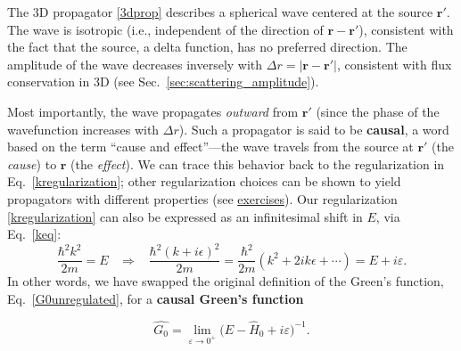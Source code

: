 \documentclass[prx,12pt]{revtex4-2}
\begin{document}
The 3D propagator \eqref{3dprop} describes a spherical wave centered
at the source $\mathbf{r}'$.  The wave is isotropic (i.e., independent
of the direction of $\mathbf{r} - \mathbf{r}'$), consistent with the
fact that the source, a delta function, has no preferred direction.
The amplitude of the wave decreases inversely with $\Delta r =
|\mathbf{r}-\mathbf{r}'|$, consistent with flux conservation in 3D
(see Sec.~\ref{sec:scattering_amplitude}).

Most importantly, the wave propagates \textit{outward} from
$\mathbf{r}'$ (since the phase of the wavefunction increases with
$\Delta r$).  Such a propagator is said to be \textbf{causal}, a word
based on the term ``cause and effect''---the wave travels from the
source at $\mathbf{r}'$ (the \textit{cause}) to $\mathbf{r}$ (the
\textit{effect}).  We can trace this behavior back to the
regularization in Eq.~\eqref{kregularization}; other regularization
choices can be shown to yield propagators with different properties
(see \hyperref[ex:anticausal]{exercises}).  Our regularization
\eqref{kregularization} can also be expressed as an infinitesimal
shift in $E$, via Eq.~\eqref{keq}:
\begin{equation}
  \frac{\hbar^2 k^2}{2m} = E
  \;\;\;\Rightarrow\;\;\;
  \frac{\hbar^2 (k+i\epsilon)^2}{2m}
  = \frac{\hbar^2}{2m} \left(k^2 + 2ik\epsilon + \cdots\right)
  = E + i\varepsilon.
\end{equation}
In other words, we have swapped the original definition of the Green's
function, Eq.~\eqref{G0unregulated}, for a \textbf{causal Green's
  function}
\begin{framed}
  \begin{equation}
    \hat{G_0} = \lim_{\varepsilon\rightarrow 0^+} \big(E - \hat{H}_0 + i \varepsilon\big)^{-1}.
    \label{G0regulated}
  \end{equation}
\end{framed}

\end{document}
